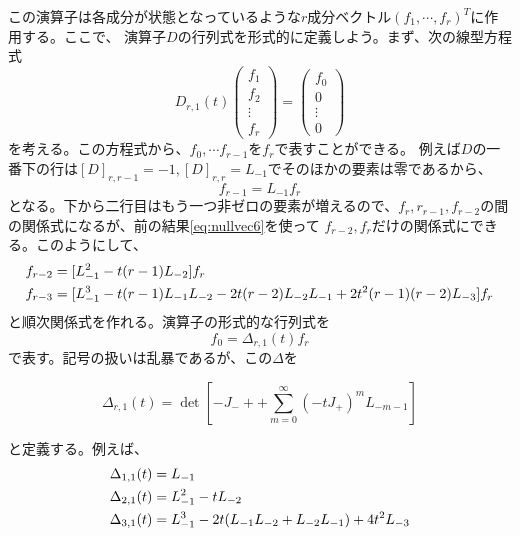 \documentclass[11pt, aps, longbibliography]{article}
\numberwithin{equation}{section}
\begin{document}
    この演算子は各成分が状態となっているような$r$成分ベクトル$(f_1, \cdots, f_r)^T$に作用する。ここで、
    演算子$D$の行列式を形式的に定義しよう。まず、次の線型方程式
    \begin{equation}\label{eq:nullvec5}
        D_{r,1}(t) \begin{pmatrix}
            f_1 \\ f_2 \\ \vdots \\ f_r
        \end{pmatrix} = \begin{pmatrix}
            f_0 \\ 0 \\ \vdots \\ 0
        \end{pmatrix}
    \end{equation}
    を考える。この方程式から、$f_0, \cdots f_{r-1}$を$f_r$で表すことができる。
    例えば$D$の一番下の行は$[D]_{r,r-1}=-1, [D]_{r,r}=L_{-1}$でそのほかの要素は零であるから、
    \begin{equation}\label{eq:nullvec6}
        f_{r-1} = L_{-1}f_r
    \end{equation}
    となる。下から二行目はもう一つ非ゼロの要素が増えるので、$f_r, r_{r-1}, f_{r-2}$の間の関係式になるが、前の結果\eqref{eq:nullvec6}を使って
    $f_{r-2},f_{r}$だけの関係式にできる。このようにして、
    \begin{align}\label{eq:nullvec7}
        f_{r-2} &= [L_{-1}^2 - t(r-1)L_{-2}]f_r \\
        f_{r-3} &= [L_{-1}^3 - t(r-1)L_{-1}L_{-2} - 2t(r-2)L_{-2}L_{-1} + 2t^2(r-1)(r-2)L_{-3}]f_r \notag
    \end{align}
    と順次関係式を作れる。演算子の形式的な行列式を
    \begin{equation}\label{eq:nullvec8}
        f_0 = \Delta_{r,1}(t) f_r
    \end{equation}
    で表す。記号の扱いは乱暴であるが、この$\Delta$を
    \begin{tcolorbox}
        \begin{equation}\label{eq:nullvec9}
            \Delta_{r,1}(t) = \det \left[ -J_- + + \sum_{m=0}^{\infty} (-tJ_+)^m L_{-m-1} \right]
        \end{equation}
    \end{tcolorbox}
    と定義する。例えば、
    \begin{align}\label{eq:nullvec10}
        \Delta_{1,1}(t) &= L_{-1} \notag \\
        \Delta_{2,1}(t) &= L_{-1}^2 -t L_{-2}  \\
        \Delta_{3,1}(t) &= L_{-1}^3 -2t( L_{-1}L_{-2} + L_{-2}L_{-1}) + 4t^2L_{-3} \notag 
    \end{align}
\end{document}

